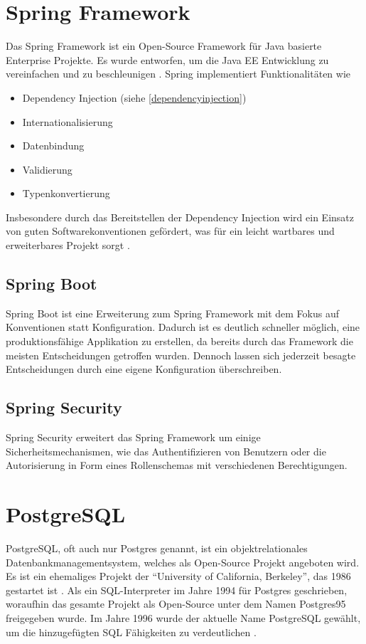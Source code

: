 \section{Spring Framework}
Das Spring Framework \cite{spring} ist ein Open-Source Framework für Java basierte Enterprise Projekte. Es wurde entworfen, um die Java EE Entwicklung zu vereinfachen und zu beschleunigen \cite{spring-book-1}. Spring implementiert Funktionalitäten wie 
\begin{itemize}
	\item Dependency Injection (siehe \ref{dependencyinjection})
	\item Internationalisierung 
	\item Datenbindung
	\item Validierung
	\item Typenkonvertierung
\end{itemize}
Insbesondere durch das Bereitstellen der Dependency Injection wird ein Einsatz von guten Softwarekonventionen gefördert, was für ein leicht wartbares und erweiterbares Projekt sorgt \cite[S.~20]{spring-book-2}.

\subsection{Spring Boot}
Spring Boot ist eine Erweiterung zum Spring Framework mit dem Fokus auf Konventionen statt Konfiguration. Dadurch ist es deutlich schneller möglich, eine produktionsfähige Applikation zu erstellen, da bereits durch das Framework die meisten Entscheidungen getroffen wurden. Dennoch lassen sich jederzeit besagte Entscheidungen durch eine eigene Konfiguration überschreiben.

\subsection{Spring Security}
Spring Security erweitert das Spring Framework um einige Sicherheitsmechanismen, wie das Authentifizieren von Benutzern oder die Autorisierung in Form eines Rollenschemas mit verschiedenen Berechtigungen.

\clearpage

\section{PostgreSQL}
PostgreSQL, oft auch nur Postgres genannt, ist ein objektrelationales Datenbankmanagementsystem, welches als Open-Source Projekt angeboten wird.
Es ist ein ehemaliges Projekt der \enquote{University of California, Berkeley}, das 1986 gestartet ist \cite{postgres-history}.
Als ein SQL-Interpreter im Jahre 1994 für Postgres geschrieben, woraufhin das gesamte Projekt als Open-Source unter dem Namen Postgres95 freigegeben wurde.
Im Jahre 1996 wurde der aktuelle Name PostgreSQL gewählt, um die hinzugefügten SQL Fähigkeiten zu verdeutlichen \cite{postgres-history}.

